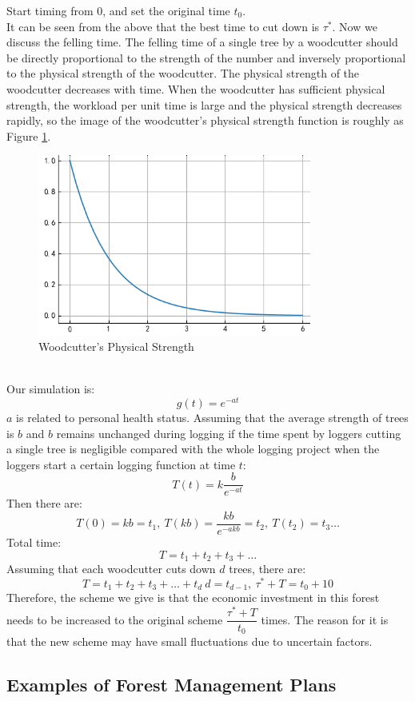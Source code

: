 \documentclass[12pt]{article}
\begin{document}
Start timing from 0, and set the original time $t_0$. \\ It can be seen from
the above that the best time to cut down is $\tau^*$. Now we discuss the
felling time. The felling time of a single tree by a woodcutter should be
directly proportional to the strength of the number and inversely proportional
to the physical strength of the woodcutter. The physical strength of the
woodcutter decreases with time. When the woodcutter has sufficient physical
strength, the workload per unit time is large and the physical strength
decreases rapidly, so the image of the woodcutter's physical strength function
is roughly as Figure \ref{602}.
\begin{figure}[ht]
    \centering
    \includegraphics[width=9cm]{602.png}
    \caption{Woodcutter's Physical Strength}
    \label{602}
\end{figure}\\
Our simulation is:
\[g(t)=e^{-at}\]
$a$ is related to personal health status. Assuming that the average strength of trees is $b$
and $b$ remains unchanged during logging if the time spent by loggers cutting a single tree is
negligible compared with the whole logging project when the loggers start a certain logging
function at time $t$:
\[T(t)=k\frac{b}{e^{-at}}\]
Then there are:
\[T(0)=kb=t_1,\ T(kb)=\frac{kb}{e^{-akb}}=t_2,\ T(t_2)=t_3\dots\]
Total time:
\[T=t_1+t_2+t_3+\dots\]
Assuming that each woodcutter cuts down $d$ trees, there are:
\[T=t_1+t_2+t_3+\dots+t_d\ d=t_{d-1},\ \tau^*+T=t_0+10\]
Therefore, the scheme we give is that the economic investment in this forest
needs to be increased to the original scheme $\dfrac{\tau^*+T}{t_0}$ times. The
reason for it is that the new scheme may have small fluctuations due to
uncertain factors.
\subsection{Examples of Forest Management Plans}
\end{document}
